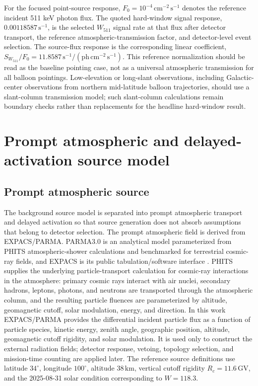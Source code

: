 \documentclass[preprint,12pt]{elsarticle}
\newcommand{\cms}{\,\mathrm{cm^{-2}\,s^{-1}}}
\newcommand{\cps}{\,\mathrm{s^{-1}}}
\newcommand{\wii}{W_{511}}
\newcommand{\fzero}{F_{0}}
\begin{document}
For the focused point-source response, $\fzero=10^{-4}\cms$ denotes the reference incident 511 keV photon flux. The quoted hard-window signal response, $0.00118587\cps$, is the selected $\wii$ signal rate at that flux after detector transport, the reference atmospheric-transmission factor, and detector-level event selection. The source-flux response is the corresponding linear coefficient, $S_{\wii}/\fzero=11.8587\,\mathrm{s^{-1}}/(\mathrm{ph\,cm^{-2}\,s^{-1}})$. This reference normalization should be read as the baseline pointing case, not as a universal atmospheric transmission for all balloon pointings. Low-elevation or long-slant observations, including Galactic-center observations from northern mid-latitude balloon trajectories, should use a slant-column transmission model; such slant-column calculations remain boundary checks rather than replacements for the headline hard-window result.

\section{Prompt atmospheric and delayed-activation source model}
\label{sec:background}

\subsection{Prompt atmospheric source}
\label{subsec:prompt_source}

The background source model is separated into prompt atmospheric transport and delayed activation so that source generation does not absorb assumptions that belong to detector selection. The prompt atmospheric field is derived from EXPACS/PARMA. PARMA3.0 is an analytical model parameterized from PHITS atmospheric-shower calculations and benchmarked for terrestrial cosmic-ray fields, and EXPACS is its public tabulation/software interface \cite{Sato2015EXPACS}. PHITS supplies the underlying particle-transport calculation for cosmic-ray interactions in the atmosphere: primary cosmic rays interact with air nuclei, secondary hadrons, leptons, photons, and neutrons are transported through the atmospheric column, and the resulting particle fluences are parameterized by altitude, geomagnetic cutoff, solar modulation, energy, and direction. In this work EXPACS/PARMA provides the differential incident particle flux as a function of particle species, kinetic energy, zenith angle, geographic position, altitude, geomagnetic cutoff rigidity, and solar modulation. It is used only to construct the external radiation fields; detector response, vetoing, topology selection, and mission-time counting are applied later. The reference source definitions use latitude $34^\circ$, longitude $100^\circ$, altitude $38\,\mathrm{km}$, vertical cutoff rigidity $R_c=11.6\,\mathrm{GV}$, and the 2025-08-31 solar condition corresponding to $W=118.3$.
\end{document}
